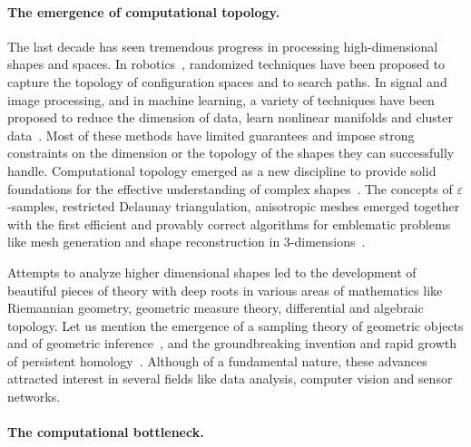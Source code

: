 \paragraph{The emergence of computational topology.}
The last decade has seen tremendous progress in processing high-dimensional shapes and spaces. In robotics~\cite{sml-pa-2006}, randomized techniques have been proposed to capture the topology of configuration spaces and to search paths. In signal and image processing, and in machine learning, a variety of techniques have been proposed to reduce the dimension of data, learn nonlinear manifolds and cluster data~\cite{hs-fmmds-2006}. %
Most  of these methods have limited guarantees and 
impose strong constraints on the dimension or the topology of the shapes they can successfully handle. Computational topology emerged as a new discipline  to 
provide solid foundations for the effective understanding of complex shapes~\cite{hh-ct-2010}. 
The concepts of $\varepsilon$-samples, restricted Delaunay triangulation, anisotropic meshes emerged together with the first efficient and provably correct algorithms for emblematic problems like mesh generation and shape reconstruction in 3-dimensions~\cite{geometrica-ecg-book}. 

Attempts to analyze higher dimensional shapes led to the development of beautiful pieces of theory with deep roots in various areas of mathematics like Riemannian geometry, geometric measure theory, differential and algebraic topology. Let us mention  the emergence of a sampling theory of geometric objects and of geometric inference~\cite{geometrica-ccl09}, and the groundbreaking invention and rapid growth of persistent homology~\cite{eh-ph-2008}.
Although of a fundamental nature, these advances 
attracted  interest in several fields like data analysis, computer vision and sensor networks.

\paragraph{The computational bottleneck.}



